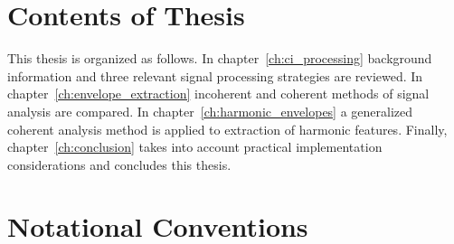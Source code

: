 \documentclass [11pt, proquest,oneside] {ganter_thesis}[2015/03/03]
\begin{document}



\section{Contents of Thesis}

This thesis is organized as follows.  In chapter~\ref{ch:ci_processing} background information and three relevant signal processing strategies are reviewed.  In chapter~\ref{ch:envelope_extraction} incoherent and coherent methods of signal analysis are compared.  In chapter~\ref{ch:harmonic_envelopes} a generalized coherent analysis method is applied to extraction of harmonic features.  Finally, chapter~\ref{ch:conclusion} takes into account practical implementation considerations and concludes this thesis.

\section{Notational Conventions}
\end{document}
